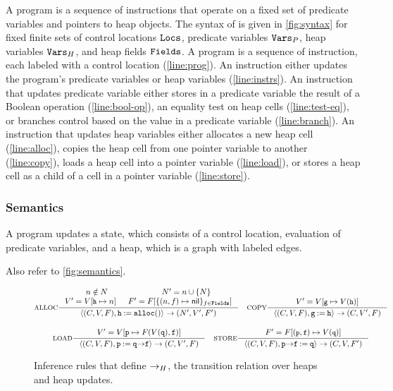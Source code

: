 A \lang program is a sequence of instructions that operate on a fixed
set of predicate variables and pointers to heap objects.
%
The syntax of \lang is given in \autoref{fig:syntax} for fixed finite
sets of control locations $\mathtt{Locs}$, predicate variables $\mathtt{Vars}_P$,
heap variables $\mathtt{Vars}_H$, and heap fields $\mathtt{Fields}$.
%
A program is a sequence of instruction, each labeled with a control
location (\autoref{line:prog}).
%
An instruction either updates the program's predicate variables or
heap variables (\autoref{line:instrs}).
%
An instruction that updates predicate variable either stores in a
predicate variable the result of a Boolean operation
(\autoref{line:bool-op}),
%
an equality test on heap cells (\autoref{line:test-eq}),
%
or branches control based on the value in a predicate variable
(\autoref{line:branch}).
%
An instruction that updates heap variables either allocates a new heap
cell (\autoref{line:alloc}),
%
copies the heap cell from one pointer variable to another
(\autoref{line:copy}),
%
loads a heap cell into a pointer variable (\autoref{line:load}),
%
or stores a heap cell as a child of a cell in a pointer variable
(\autoref{line:store}).

\subsubsection{Semantics}
\label{sec:semantics}
%
A \lang program updates a state, which consists of a control location,
evaluation of predicate variables, and a heap, which is a graph with
labeled edges.
%

Also refer to \autoref{fig:semantics}.

\begin{figure*}
  \centering
  \begin{gather*}
    \inference[ALLOC]
    { n \notin N & N' = \add{n}{N} \\
      V' = \upd{V}{\cc{h}}{n}
      & F' = F[ \{ (n, f) \mapsto \nil \}_{f \in \fields} ]
    }
    { \langle (C, V, F), \code{h \assign \alloc()} \rangle \step
      (N', V', F')
    } \rulebuffer
    \inference[COPY]
    {  V' = \upd{V}{\cc{g}}{V(\cc{h})}
    }
    { \langle (C, V, F), \code{g \assign h} \rangle \step
      (C, V', F)
    } \\[\rowspace]
    \inference[LOAD]
    { V' = \upd{V}{\code{p}}{F(V(\code{q}), \code{f})}
    }
    { \langle (C, V, F), \code{p \assign q \select f} \rangle \step
      (C, V', F)
    } \rulebuffer
    \inference[STORE]
    { F' = \upd{F}{(\cc{p}, \cc{f})}{V(\cc{q})}
    }
    { \langle (C, V, F), \code{p \select f \assign q } \rangle
      \step
      (C, V, F')
    }
  \end{gather*}
  \caption{Inference rules that define $\rightarrow_H$, the transition
    relation over heaps and heap updates.}
  \label{fig:semantics}
\end{figure*}

